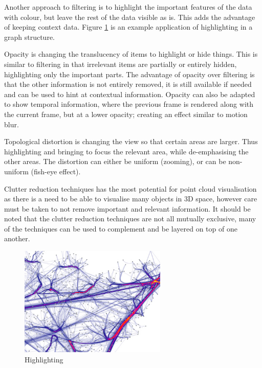 Another approach to filtering is to highlight the important features of the
data with colour, but leave the rest of the data visible as is. This adds the
advantage of keeping context data. Figure \ref{fig:graphhighlight} is an
example application of highlighting in a graph structure.

Opacity is changing the translucency of items to highlight or hide things. This
is similar to filtering in that irrelevant items are partially or entirely
hidden, highlighting only the important parts. The advantage of opacity over
filtering is that the other information is not entirely removed, it is still
available if needed and can be used to hint at contextual information. Opacity
can also be adapted to show temporal information, where the previous frame is
rendered along with the current frame, but at a lower opacity; creating an
effect similar to motion blur.

Topological distortion is changing the view so that certain areas are larger.
Thus highlighting and bringing to focus the relevant area, while de-emphasising
the other areas. The distortion can either be uniform (zooming), or can be
non-uniform (fish-eye effect).

Clutter reduction techniques has the most potential for point cloud
visualisation as there is a need to be able to visualise many objects in 3D
space, however care must be taken to not remove important and relevant
information. It should be noted that the clutter reduction techniques are not
all mutually exclusive, many of the techniques can be used to complement and be
layered on top of one another.

\begin{figure}[h!]
  \begin{center}
    \includegraphics[width=70mm]{graph_highlight}
  \end{center}
  \caption{Highlighting}
  \label{fig:graphhighlight}
\end{figure}


